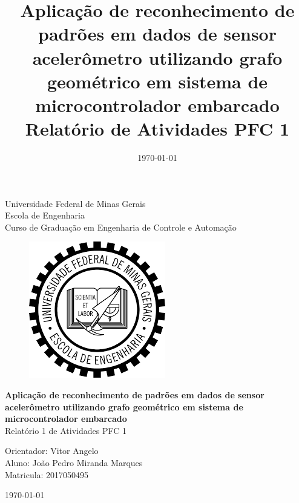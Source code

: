 \begin{titlepage}
    \begin{center}
           
    {\large Universidade Federal de Minas Gerais\\
    Escola de Engenharia \\
    Curso de Graduação em Engenharia de Controle e Automação\\}
    \vfill

    \begin{figure}[h]
        \centering
        \includegraphics[scale=0.5]{images/brasao_ufmg.png}
    \end{figure}
    \vspace{2cm}


    {\bf\Large Aplicação de reconhecimento de padrões em dados de sensor acelerômetro utilizando grafo geométrico em sistema de microcontrolador embarcado\\}
    \vspace{1cm} 
    {\Large Relatório 1 de Atividades PFC 1}
    \vspace{2cm}  
    
    {\large Orientador: Vitor Angelo}\\

    
    {\large Aluno: João Pedro Miranda Marques \\
    Matricula: 2017050495}
    \vspace{2cm}  

    \today
    \vspace{2cm}  
       

    \large \date{\today}
    \end{center}
    
    \end{titlepage}
    
    \newpage
    \clearpage
    \thispagestyle{empty}
    
    \cleardoublepage


\title{
    Aplicação de reconhecimento de padrões em dados de sensor acelerômetro utilizando grafo geométrico em sistema de microcontrolador embarcado \\
    \large Relatório de Atividades PFC 1}


